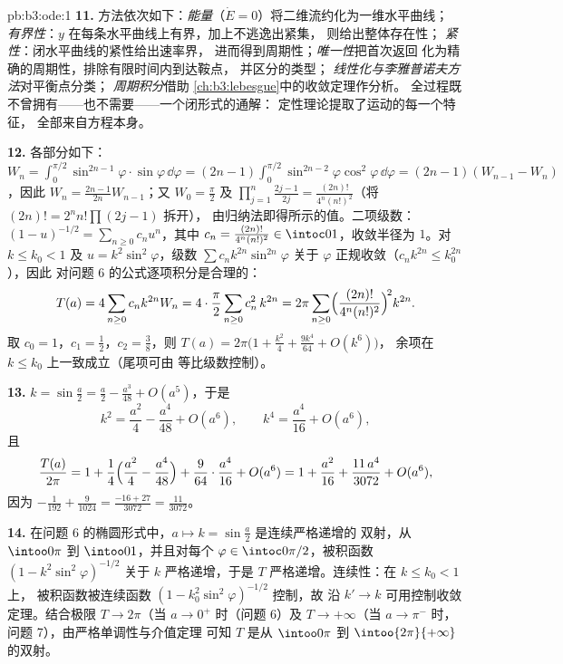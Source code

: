 \begin{solution}{pb:b3:ode:1}
\textbf{11.} 方法依次如下：\emph{能量}（$\dot E =
0$）将二维流约化为一维水平曲线；
\emph{有界性}：$y$ 在每条水平曲线上有界，加上不逃逸出紧集，
则给出整体存在性；
\emph{紧性}：闭水平曲线的紧性给出速率界，
进而得到周期性；\emph{唯一性}把首次返回
化为精确的周期性，排除有限时间内到达鞍点，
并区分的类型；
\emph{线性化与李雅普诺夫方法}对平衡点分类；
\emph{周期积分}借助
\cref{ch:b3:lebesgue}中的收敛定理作分析。
全过程既不曾拥有——也不需要——一个闭形式的通解：
定性理论提取了运动的每一个特征，
全部来自方程本身。

\textbf{12.} 各部分如下：$W_n = \int_0^{\pi/2}\sin^{2n-1}\varphi
\cdot\sin\varphi\,\dd\varphi = (2n-1)\int_0^{\pi/2}
\sin^{2n-2}\varphi\cos^2\varphi\,\dd\varphi = (2n-1)(W_{n-1}
- W_n)$，因此 $W_n = \frac{2n-1}{2n}W_{n-1}$；又 $W_0 =
\frac\pi2$ 及 $\prod_{j=1}^n\frac{2j-1}{2j} =
\frac{(2n)!}{4^n(n!)^2}$（将 $(2n)! = 2^nn!\prod(2j-1)$ 拆开），
由归纳法即得所示的值。二项级数：$(1 -
u)^{-1/2} = \sum_{n\geq0}c_nu^n$，其中 $c_n =
\frac{(2n)!}{4^n(n!)^2} \in \intoc01$，收敛半径为 $1$。对 $k
\leq k_0 < 1$ 及 $u = k^2\sin^2\varphi$，级数
$\sum c_nk^{2n}\sin^{2n}\varphi$ 关于
$\varphi$ 正规收敛（$c_nk^{2n} \leq k_0^{2n}$），因此
对问题 6 的公式逐项积分是合理的：
\[
T(a) = 4\sum_{n\geq0}c_nk^{2n}W_n
= 4\cdot\frac\pi2\sum_{n\geq0}c_n^2\,k^{2n}
= 2\pi\sum_{n\geq0}
\Bigl(\frac{(2n)!}{4^n(n!)^2}\Bigr)^{\!2}k^{2n} .
\]
取 $c_0 = 1$，$c_1 = \frac12$，$c_2 = \frac38$，则 $T(a) =
2\pi\bigl(1 + \frac{k^2}4 + \frac{9k^4}{64} + O(k^6)\bigr)$，
余项在 $k \leq k_0$ 上一致成立（尾项可由
等比级数控制）。

\textbf{13.} $k = \sin\frac a2 = \frac a2 - \frac{a^3}{48} +
O(a^5)$，于是
\[
k^2 = \frac{a^2}4 - \frac{a^4}{48} + O(a^6),
\qquad
k^4 = \frac{a^4}{16} + O(a^6) ,
\]
且
\[
\frac{T(a)}{2\pi} = 1 + \frac14\Bigl(\frac{a^2}4 -
\frac{a^4}{48}\Bigr) + \frac9{64}\cdot\frac{a^4}{16} +
O(a^6)
= 1 + \frac{a^2}{16} + \frac{11\,a^4}{3072} + O(a^6) ,
\]
因为 $-\frac1{192} + \frac9{1024} = \frac{-16 + 27}{3072}
= \frac{11}{3072}$。

\textbf{14.} 在问题 6 的椭圆形式中，$a \mapsto
k = \sin\frac a2$ 是连续严格递增的
双射，从 $\intoo0\pi$ 到 $\intoo01$，并且对每个
$\varphi \in \intoc0{\pi/2}$，被积函数 $(1 -
k^2\sin^2\varphi)^{-1/2}$ 关于 $k$ 严格递增，于是 $T$
严格递增。连续性：在 $k \leq k_0 < 1$ 上，
被积函数被连续函数 $(1 -
k_0^2\sin^2\varphi)^{-1/2}$ 控制，故
沿 $k' \to k$ 可用控制收敛定理。结合极限 $T \to 2\pi$（当 $a
\to 0^+$ 时（问题 6）及 $T \to +\infty$（当 $a \to \pi^-$
时，问题 7），由严格单调性与介值定理
可知 $T$ 是从 $\intoo0\pi$ 到
$\intoo{2\pi}{+\infty}$ 的双射。


\end{solution}
